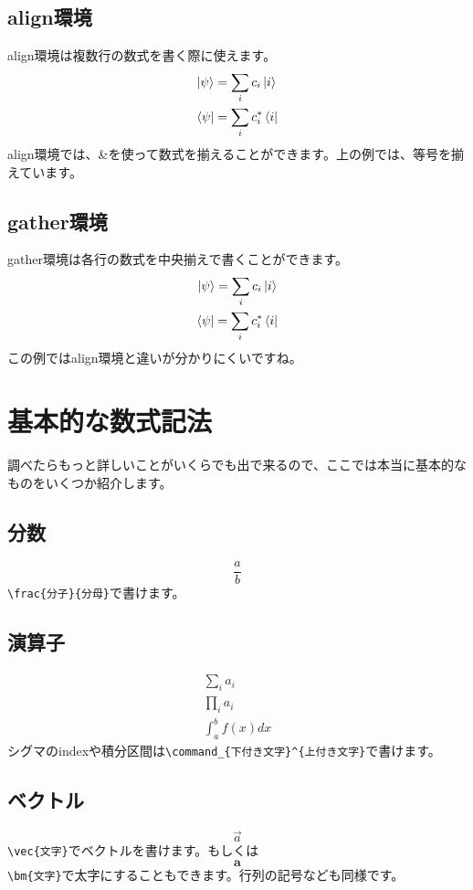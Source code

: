\documentclass[paper=a4, fontsize=10pt]{jlreq}
\begin{document}
\subsection{align環境}
align環境は複数行の数式を書く際に使えます。
\begin{align}
    \ket{\psi} &= \sum_{i} c_i \ket{i} \\
    \bra{\psi} &= \sum_{i} c_i^* \bra{i}
\end{align}
align環境では、\&を使って数式を揃えることができます。上の例では、等号を揃えています。
\subsection{gather環境}
gather環境は各行の数式を中央揃えで書くことができます。
\begin{gather}
    \ket{\psi} = \sum_{i} c_i \ket{i} \\
    \bra{\psi} = \sum_{i} c_i^* \bra{i}
\end{gather}
この例ではalign環境と違いが分かりにくいですね。
\section{基本的な数式記法}
調べたらもっと詳しいことがいくらでも出で来るので、ここでは本当に基本的なものをいくつか紹介します。
\subsection{分数}
\begin{equation*}
    \frac{a}{b}
\end{equation*}
\verb|\frac{分子}{分母}|で書けます。
\subsection{演算子}
\begin{gather*}
    \sum_{i} a_i \\
    \prod_{i} a_i \\
    \int_{a}^{b} f(x) dx
\end{gather*}
シグマのindexや積分区間は\verb|\command_{下付き文字}^{上付き文字}|で書けます。
\subsection{ベクトル}
\begin{equation*}
    \vec{a}
\end{equation*}
\verb|\vec{文字}|でベクトルを書けます。もしくは
\begin{equation*}
    \bm{a}
\end{equation*}
\verb|\bm{文字}|で太字にすることもできます。行列の記号なども同様です。
\end{document}
